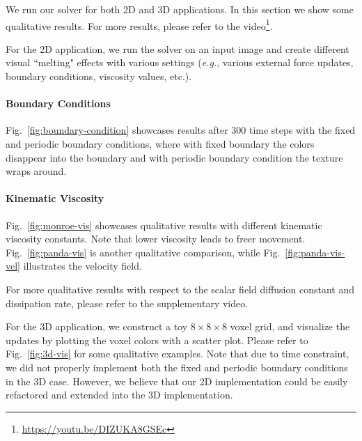\documentclass[sigconf]{acmart}
\begin{document}
We run our solver for both 2D and 3D applications. In this section we show some qualitative results. For more results, please refer to the video\footnote{\url{https://youtu.be/DIZUKA8GSEc}}.

For the 2D application, we run the solver on an input image and create different visual ``melting" effects with various settings (\emph{e.g.}, various external force updates, boundary conditions, viscosity values, etc.).
\paragraph{Boundary Conditions} Fig.~\ref{fig:boundary-condition} showcases results after 300 time steps with the fixed and periodic boundary conditions, where with fixed boundary the colors disappear into the boundary and with periodic boundary condition the texture wraps around.

\paragraph{Kinematic Viscosity} Fig.~\ref{fig:monroe-vis} showcases qualitative results with different kinematic viscosity constants. Note that lower viscosity leads to freer movement. Fig.~\ref{fig:panda-vis} is another qualitative comparison, while Fig.~\ref{fig:panda-vis-vel} illustrates the velocity field.

For more qualitative results with respect to the scalar field diffusion constant and dissipation rate, please refer to the supplementary video. 

For the 3D application, we construct a toy $8\times 8\times 8$ voxel grid, and visualize the updates by plotting the voxel colors with a scatter plot. Please refer to Fig.~\ref{fig:3d-vis} for some qualitative examples. Note that due to time constraint, we did not properly implement both the fixed and periodic boundary conditions in the 3D case. However, we believe that our 2D implementation could be easily refactored and extended into the 3D implementation.



\end{document}

